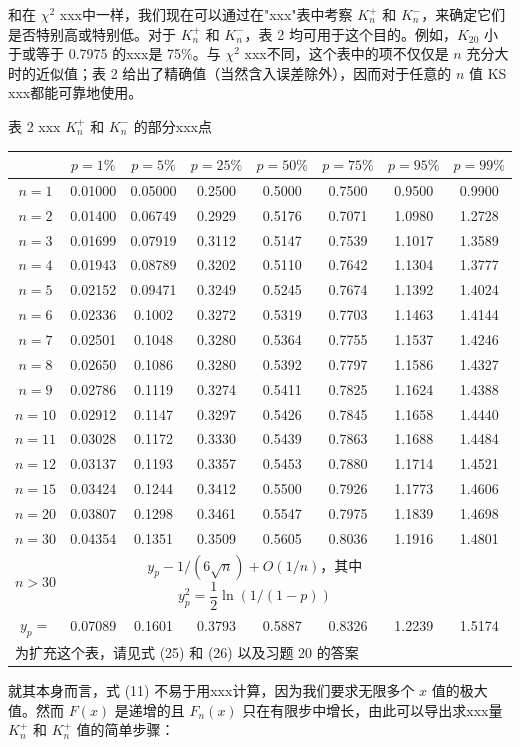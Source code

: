 和在 $\chi^2$ xxx中一样，我们现在可以通过在"xxx"表中考察 $K_n^+$ 和 $K_n^-$，来确定它们是否特别高或特别低。对于 $K_n^+$ 和 $K_n^-$，表 2 均可用于这个目的。例如，$K_{20}$ 小于或等于 0.7975 的xxx是 75\%。与 $\chi^2$ xxx不同，这个表中的项不仅仅是 $n$ 充分大时的近似值；表 2 给出了精确值（当然含入误差除外），因而对于任意的 $n$ 值 KS xxx都能可靠地使用。

\begin{center}
表 2 \quad xxx $K_n^+$ 和 $K_n^-$ 的部分xxx点
\end{center}

\begin{table}[h]
\centering
\begin{tabular}{|c|c|c|c|c|c|c|c|}
\hline
 & $p=1\%$ & $p=5\%$ & $p=25\%$ & $p=50\%$ & $p=75\%$ & $p=95\%$ & $p=99\%$ \\
\hline
$n=1$ & 0.01000 & 0.05000 & 0.2500 & 0.5000 & 0.7500 & 0.9500 & 0.9900 \\
\hline
$n=2$ & 0.01400 & 0.06749 & 0.2929 & 0.5176 & 0.7071 & 1.0980 & 1.2728 \\
\hline
$n=3$ & 0.01699 & 0.07919 & 0.3112 & 0.5147 & 0.7539 & 1.1017 & 1.3589 \\
\hline
$n=4$ & 0.01943 & 0.08789 & 0.3202 & 0.5110 & 0.7642 & 1.1304 & 1.3777 \\
\hline
$n=5$ & 0.02152 & 0.09471 & 0.3249 & 0.5245 & 0.7674 & 1.1392 & 1.4024 \\
\hline
$n=6$ & 0.02336 & 0.1002 & 0.3272 & 0.5319 & 0.7703 & 1.1463 & 1.4144 \\
\hline
$n=7$ & 0.02501 & 0.1048 & 0.3280 & 0.5364 & 0.7755 & 1.1537 & 1.4246 \\
\hline
$n=8$ & 0.02650 & 0.1086 & 0.3280 & 0.5392 & 0.7797 & 1.1586 & 1.4327 \\
\hline
$n=9$ & 0.02786 & 0.1119 & 0.3274 & 0.5411 & 0.7825 & 1.1624 & 1.4388 \\
\hline
$n=10$ & 0.02912 & 0.1147 & 0.3297 & 0.5426 & 0.7845 & 1.1658 & 1.4440 \\
\hline
$n=11$ & 0.03028 & 0.1172 & 0.3330 & 0.5439 & 0.7863 & 1.1688 & 1.4484 \\
\hline
$n=12$ & 0.03137 & 0.1193 & 0.3357 & 0.5453 & 0.7880 & 1.1714 & 1.4521 \\
\hline
$n=15$ & 0.03424 & 0.1244 & 0.3412 & 0.5500 & 0.7926 & 1.1773 & 1.4606 \\
\hline
$n=20$ & 0.03807 & 0.1298 & 0.3461 & 0.5547 & 0.7975 & 1.1839 & 1.4698 \\
\hline
$n=30$ & 0.04354 & 0.1351 & 0.3509 & 0.5605 & 0.8036 & 1.1916 & 1.4801 \\
\hline
$n>30$ & \multicolumn{6}{c|}{$y_p - 1/(6\sqrt{n}) + O(1/n)$，其中 $y_p^2 = \dfrac{1}{2}\ln(1/(1-p))$} \\
\hline
$y_p =$ & 0.07089 & 0.1601 & 0.3793 & 0.5887 & 0.8326 & 1.2239 & 1.5174 \\
\hline
\multicolumn{8}{|l|}{为扩充这个表，请见式 (25) 和 (26) 以及习题 20 的答案} \\
\hline
\end{tabular}
\end{table}
就其本身而言，式 (11) 不易于用xxx计算，因为我们要求无限多个 $x$ 值的极大值。然而 $F(x)$ 是递增的且 $F_n(x)$ 只在有限步中增长，由此可以导出求xxx量 $K_n^+$ 和 $K_n^+$ 值的简单步骤：

